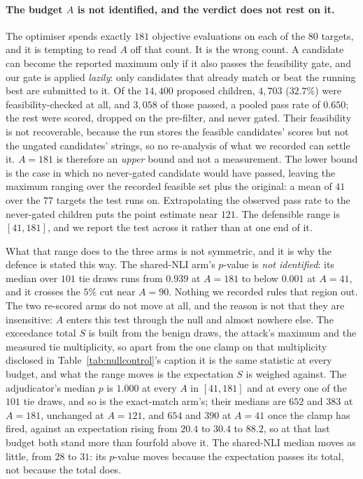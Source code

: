 \paragraph{The budget $A$ is not identified, and the verdict does not rest on it.}
The optimiser spends exactly $181$ objective evaluations on each of the $80$ targets, and it
is tempting to read $A$ off that count. It is the wrong count. A candidate can become the
reported maximum only if it also passes the feasibility gate, and our gate is applied
\emph{lazily}: only candidates that already match or beat the running best are submitted to
it. Of the $14{,}400$ proposed children, $4{,}703$ ($32.7\%$) were feasibility-checked at
all, and $3{,}058$ of those passed, a pooled pass rate of $0.650$; the rest were scored,
dropped on the pre-filter, and never gated. Their feasibility is not recoverable, because the
run stores the feasible candidates' scores but not the ungated candidates' strings, so no
re-analysis of what we recorded can settle it. $A{=}181$ is therefore an \emph{upper} bound
and not a measurement. The lower bound is the case in which no never-gated candidate would
have passed, leaving the maximum ranging over the recorded feasible set plus the original: a
mean of $41$ over the $77$ targets the test runs on. Extrapolating the observed pass rate to
the never-gated children puts the point estimate near $121$. The defensible range is
$[41,181]$, and we report the test across it rather than at one end of it.

What that range does to the three arms is not symmetric, and it is why the defence is stated
this way. The shared-NLI arm's $p$-value is \emph{not identified}: its median over $101$ tie
draws runs from $0.939$ at $A{=}181$ to below $0.001$ at $A{=}41$, and it crosses the $5\%$
cut near $A{=}90$. Nothing we recorded rules that region out. The two re-scored arms do not
move at all, and the reason is not that they are insensitive: $A$ enters this test through
the null and almost nowhere else. The exceedance total $S$ is built from the benign draws,
the attack's maximum and the measured tie multiplicity, so apart from the one clamp on that
multiplicity disclosed in Table~\ref{tab:nullcontrol}'s caption it is the same statistic at
every budget, and what the range moves is the expectation $S$ is weighed against. The
adjudicator's median $p$ is $1.000$ at every $A$ in $[41,181]$ and at every one of the $101$
tie draws, and so is the exact-match arm's; their medians are $652$ and $383$ at $A{=}181$,
unchanged at $A{=}121$, and $654$ and $390$ at $A{=}41$ once the clamp has fired, against an
expectation rising from $20.4$ to $30.4$ to $88.2$, so at that last budget both stand more
than fourfold above it. The shared-NLI median moves as little, from $28$ to $31$: its
$p$-value moves because the expectation passes its total, not because the total does.

